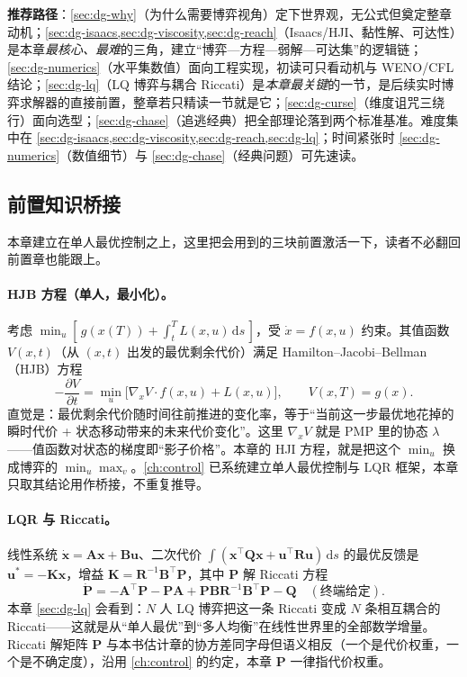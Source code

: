 \noindent\textbf{推荐路径}：\cref{sec:dg-why}（为什么需要博弈视角）定下世界观，无公式但奠定整章动机；\cref{sec:dg-isaacs,sec:dg-viscosity,sec:dg-reach}（Isaacs/HJI、黏性解、可达性）是本章\emph{最核心、最难}的三角，建立“博弈—方程—弱解—可达集”的逻辑链；\cref{sec:dg-numerics}（水平集数值）面向工程实现，初读可只看动机与 WENO/CFL 结论；\cref{sec:dg-lq}（LQ 博弈与耦合 Riccati）是\emph{本章最关键}的一节，是后续实时博弈求解器的直接前置，整章若只精读一节就是它；\cref{sec:dg-curse}（维度诅咒三绕行）面向选型；\cref{sec:dg-chase}（追逃经典）把全部理论落到两个标准基准。难度集中在 \cref{sec:dg-isaacs,sec:dg-viscosity,sec:dg-reach,sec:dg-lq}；时间紧张时 \cref{sec:dg-numerics}（数值细节）与 \cref{sec:dg-chase}（经典问题）可先速读。

\subsection*{前置知识桥接}
\label{sec:dg-bridge}
本章建立在单人最优控制之上，这里把会用到的三块前置激活一下，读者不必翻回前置章也能跟上。

\paragraph{HJB 方程（单人，最小化）。}
考虑 $\min_u[\,g(x(T))+\int_t^T L(x,u)\,\mathrm ds\,]$，受 $\dot x=f(x,u)$ 约束。其值函数 $V(x,t)$（从 $(x,t)$ 出发的最优剩余代价）满足 Hamilton--Jacobi--Bellman（HJB）方程
\begin{equation}
  -\frac{\partial V}{\partial t}=\min_{u}\Big[\nabla_x V\cdot f(x,u)+L(x,u)\Big],\qquad V(x,T)=g(x).
  \label{eq:dg-hjb}
\end{equation}
直觉是：最优剩余代价随时间往前推进的变化率，等于“当前这一步最优地花掉的瞬时代价 + 状态移动带来的未来代价变化”。这里 $\nabla_x V$ 就是 PMP 里的协态 $\lambda$——值函数对状态的梯度即“影子价格”。本章的 HJI 方程，就是把这个 $\min_u$ 换成博弈的 $\min_u\max_v$。\cref{ch:control} 已系统建立单人最优控制与 LQR 框架，本章只取其结论用作桥接，不重复推导。

\paragraph{LQR 与 Riccati。}
线性系统 $\dot{\mathbf x}=\mathbf A\mathbf x+\mathbf B\mathbf u$、二次代价 $\int(\mathbf x^\top\mathbf Q\mathbf x+\mathbf u^\top\mathbf R\mathbf u)\,\mathrm ds$ 的最优反馈是 $\mathbf u^*=-\mathbf K\mathbf x$，增益 $\mathbf K=\mathbf R^{-1}\mathbf B^\top\mathbf P$，其中 $\mathbf P$ 解 Riccati 方程
\begin{equation}
  \dot{\mathbf P}=-\mathbf A^\top\mathbf P-\mathbf P\mathbf A+\mathbf P\mathbf B\mathbf R^{-1}\mathbf B^\top\mathbf P-\mathbf Q\quad(\text{终端给定}).
  \label{eq:dg-riccati}
\end{equation}
本章 \cref{sec:dg-lq} 会看到：$N$ 人 LQ 博弈把这一条 Riccati 变成 $N$ 条相互耦合的 Riccati——这就是从“单人最优”到“多人均衡”在线性世界里的全部数学增量。Riccati 解矩阵 $\mathbf P$ 与本书估计章的协方差同字母但语义相反（一个是代价权重，一个是不确定度），沿用 \cref{ch:control} 的约定，本章 $\mathbf P$ 一律指代价权重。

